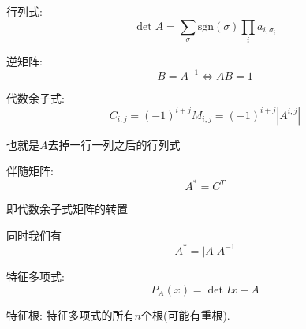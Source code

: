 行列式: $$\det A = \sum_{\sigma} \text{sgn}(\sigma) \prod_{i}a_{i, \sigma_i}$$

逆矩阵: $$B = A^{-1} \iff AB = 1$$

代数余子式: $$C_{i, j} = (-1)^{i + j} M_{i, j} = (-1) ^ {i + j} \left| A ^ {i, j} \right|$$

也就是$A$去掉一行一列之后的行列式

伴随矩阵: $$A^{*} = C^T$$

即代数余子式矩阵的转置

同时我们有 $$ A^{*} = |A| A^{-1}$$

特征多项式: $$P_A(x) = \det{Ix - A}$$

特征根: 特征多项式的所有$n$个根(可能有重根).